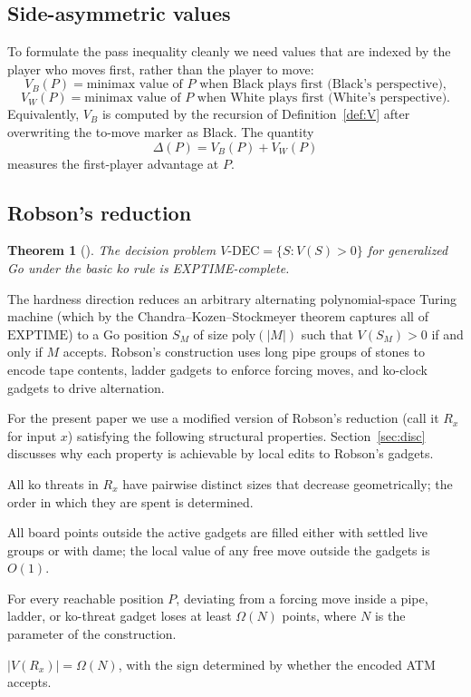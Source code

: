 \documentclass[11pt,a4paper]{amsart}
\theoremstyle{plain}
\newtheorem{theorem}{Theorem}[section]
\theoremstyle{definition}
\theoremstyle{remark}
\newcommand{\EXPTIME}{\mathrm{EXPTIME}}
\begin{document}
\subsection{Side-asymmetric values}
\label{sec:VBVW}

To formulate the pass inequality cleanly we need values that are
indexed by the player who moves first, rather than the player to move:
\[
  V_B(P) = \text{minimax value of $P$ when Black plays first
    (Black's perspective),}
\]
\[
  V_W(P) = \text{minimax value of $P$ when White plays first
    (White's perspective).}
\]
Equivalently, $V_B$ is computed by the recursion of
Definition~\ref{def:V} after overwriting the to-move marker as Black.
The quantity
\[
  \Delta(P) = V_B(P) + V_W(P)
\]
measures the first-player advantage at $P$.

\subsection{Robson's reduction}
\label{sec:robson}

\begin{theorem}[\cite{Rob83}]
\label{thm:robson}
The decision problem $V\text{-DEC} = \{S : V(S) > 0\}$ for generalized
Go under the basic ko rule is EXPTIME-complete.
\end{theorem}

The hardness direction reduces an arbitrary alternating polynomial-space
Turing machine (which by the Chandra--Kozen--Stockmeyer theorem
\cite{CKS81} captures all of $\EXPTIME$) to a Go position $S_M$ of
size $\mathrm{poly}(|M|)$ such that $V(S_M) > 0$ if and only if $M$
accepts. Robson's construction uses long pipe groups of stones to
encode tape contents, ladder gadgets to enforce forcing moves, and
ko-clock gadgets to drive alternation.

For the present paper we use a modified version of Robson's reduction
(call it $R_x$ for input $x$) satisfying the following structural
properties. Section~\ref{sec:disc} discusses why each property is
achievable by local edits to Robson's gadgets.

\begin{description}[leftmargin=3em,style=nextline]
  \item[\textbf{(A1) Strict ko-threat ordering.}]
    All ko threats in $R_x$ have pairwise distinct sizes that decrease
    geometrically; the order in which they are spent is determined.
  \item[\textbf{(A2) Full board fill.}]
    All board points outside the active gadgets are filled either with
    settled live groups or with dame; the local value of any free move
    outside the gadgets is $O(1)$.
  \item[\textbf{(A3) Forcing-move gap.}]
    For every reachable position $P$, deviating from a forcing move
    inside a pipe, ladder, or ko-threat gadget loses at least
    $\Omega(N)$ points, where $N$ is the parameter of the construction.
  \item[\textbf{(R1) Value separation.}]
    $|V(R_x)| = \Omega(N)$, with the sign determined by whether the
    encoded ATM accepts.
\end{description}
\end{document}
